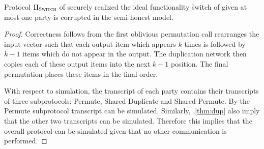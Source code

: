 \begin{theorem}\label{thm:switch}
	Protocol $\Pi_{\textsc{Switch}}$ of  securely realized the ideal functionality \f{switch} of  given at most one party is corrupted in the semi-honest  model.
\end{theorem}
\begin{proof}
	Correctness follows from the first oblivious permutation call rearranges the input vector such that each output item which appears $k$ times is followed by $k-1$ items which do not appear in the output. The duplication network then copies each of these output items into the next $k-1$ position. The final permutation places these items in the final order. 
	
	With respect to simulation, the transcript of each party contains their transcripts of three subprotocols: Permute, Shared-Duplicate and Shared-Permute. By  the Permute subprotocol transcript can be simulated. Similarly, ,\ref{thm:dup} also imply that the other two transcripts can be simulated. Therefore this implies that the overall protocol can be simulated given that no other communication is performed. 
		
\end{proof}
%
%
%
%
%
%			
%			
%
%			
%			
